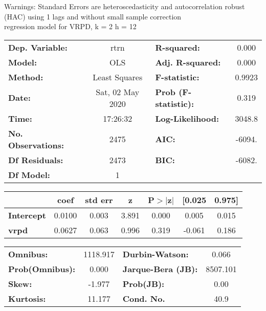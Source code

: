Warnings: \newline
 [1] Standard Errors are heteroscedasticity and autocorrelation robust (HAC) using 1 lags and without small sample correction\\ 

regression model for VRPD, k = 2 h = 12\begin{center}
\begin{tabular}{lclc}
\toprule
\textbf{Dep. Variable:}    &       rtrn       & \textbf{  R-squared:         } &     0.000   \\
\textbf{Model:}            &       OLS        & \textbf{  Adj. R-squared:    } &     0.000   \\
\textbf{Method:}           &  Least Squares   & \textbf{  F-statistic:       } &    0.9923   \\
\textbf{Date:}             & Sat, 02 May 2020 & \textbf{  Prob (F-statistic):} &    0.319    \\
\textbf{Time:}             &     17:26:32     & \textbf{  Log-Likelihood:    } &    3048.8   \\
\textbf{No. Observations:} &        2475      & \textbf{  AIC:               } &    -6094.   \\
\textbf{Df Residuals:}     &        2473      & \textbf{  BIC:               } &    -6082.   \\
\textbf{Df Model:}         &           1      & \textbf{                     } &             \\
\bottomrule
\end{tabular}
\begin{tabular}{lcccccc}
                   & \textbf{coef} & \textbf{std err} & \textbf{z} & \textbf{P$> |$z$|$} & \textbf{[0.025} & \textbf{0.975]}  \\
\midrule
\textbf{Intercept} &       0.0100  &        0.003     &     3.891  &         0.000        &        0.005    &        0.015     \\
\textbf{vrpd}      &       0.0627  &        0.063     &     0.996  &         0.319        &       -0.061    &        0.186     \\
\bottomrule
\end{tabular}
\begin{tabular}{lclc}
\textbf{Omnibus:}       & 1118.917 & \textbf{  Durbin-Watson:     } &    0.066  \\
\textbf{Prob(Omnibus):} &   0.000  & \textbf{  Jarque-Bera (JB):  } & 8507.101  \\
\textbf{Skew:}          &  -1.977  & \textbf{  Prob(JB):          } &     0.00  \\
\textbf{Kurtosis:}      &  11.177  & \textbf{  Cond. No.          } &     40.9  \\
\bottomrule
\end{tabular}
\end{center}


